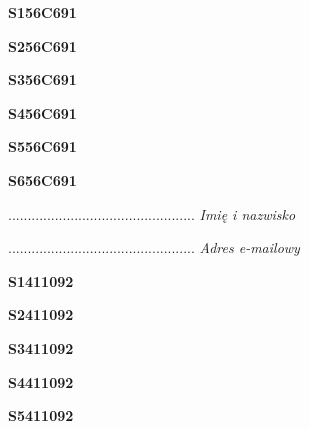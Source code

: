 \begin{turn}{90}\huge \textbf{S156C691}\end{turn}

\begin{turn}{90}\huge \textbf{S256C691}\end{turn}

\begin{turn}{90}\huge \textbf{S356C691}\end{turn}

\begin{turn}{90}\huge \textbf{S456C691}\end{turn}

\begin{turn}{90}\huge \textbf{S556C691}\end{turn}

\begin{turn}{90}\huge \textbf{S656C691}\end{turn}

\begin{turn}{90}\begin{minipage}{\linewidth} \vspace{20mm} ................................................  \textit{Imię i nazwisko}\end{minipage}\end{turn}

\begin{turn}{90}\begin{minipage}{\linewidth} \vspace{20mm} ................................................  \textit{Adres e-mailowy}\end{minipage}\end{turn}

\begin{turn}{90}\huge \textbf{S1411092}\end{turn}

\begin{turn}{90}\huge \textbf{S2411092}\end{turn}

\begin{turn}{90}\huge \textbf{S3411092}\end{turn}

\begin{turn}{90}\huge \textbf{S4411092}\end{turn}

\begin{turn}{90}\huge \textbf{S5411092}\end{turn}

